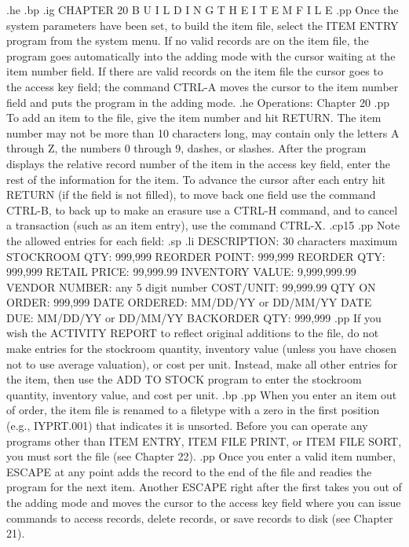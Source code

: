 .he
.bp
.ig
CHAPTER 20
B U I L D I N G   T H E   I T E M   F I L E
.pp
Once the system parameters have been set, to build the item file, select the
ITEM ENTRY program from the system menu.  If no valid records are on the
item file, the program goes automatically into the adding mode with the
cursor waiting at the item number field.  If there are valid records on
the item file the cursor goes to the access key field; the command
CTRL-A moves the cursor to the item number field and puts the program in
the adding mode.
.he Operations: Chapter 20
.pp
To add an item to the file, give the item number and hit RETURN.  The item
number may not be more than 10 characters long, may contain only the
letters A through Z, the numbers 0 through 9, dashes, or slashes.  After
the program displays the relative record number of the item in the
access key field, enter the rest of the information for the item.
To advance the cursor
after each entry hit RETURN (if the field is not filled), to move back
one field use the command CTRL-B, to back up to make an erasure use a
CTRL-H command, and to cancel a transaction (such as an item entry),
use the command CTRL-X.
.cp15
.pp
Note the allowed entries for each field:
.sp
.li
	  DESCRIPTION:	     30 characters maximum
	  STOCKROOM QTY:     999,999
	  REORDER POINT:     999,999
	  REORDER QTY:	     999,999
	  RETAIL PRICE:      99,999.99
	  INVENTORY VALUE:   9,999,999.99
	  VENDOR NUMBER:     any 5 digit number
	  COST/UNIT:	     99,999.99
	  QTY ON ORDER:      999,999
	  DATE ORDERED:      MM/DD/YY or DD/MM/YY
	  DATE DUE:	     MM/DD/YY or DD/MM/YY
	  BACKORDER QTY:     999,999
.pp
If you wish the ACTIVITY REPORT to reflect original additions to the
file, do not make entries for the stockroom quantity, inventory value
(unless you have chosen not to use average valuation), or
cost per unit.	Instead, make all other entries for the item, then
use the ADD TO STOCK program to enter the stockroom quantity, inventory
value, and cost per unit.
.bp
.pp
When you enter an item out of order, the item file is renamed to a
filetype with a zero in the first position (e.g., IYPRT.001)
that indicates it is unsorted.	Before you can operate any programs
other than ITEM ENTRY, ITEM FILE PRINT, or ITEM FILE SORT, you must sort
the file (see Chapter 22).
.pp
Once you enter a valid item number, ESCAPE at any point adds the record
to the end of the file and readies the program for the next item.  Another
ESCAPE right after the first takes you out of the adding mode and moves
the cursor to the access key field where you can issue commands to
access records, delete records, or save records to disk (see Chapter 21).
